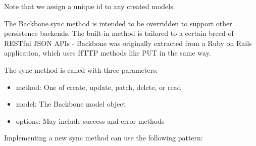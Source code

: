 \documentclass[9pt]{book}
\begin{document}
Note that we assign a unique id to any created models.

The Backbone.sync method is intended to be overridden to support other
persistence backends. The built-in method is tailored to a certain breed
of RESTful JSON APIs - Backbone was originally extracted from a Ruby on
Rails application, which uses HTTP methods like PUT in the same way.

The sync method is called with three parameters:

\begin{itemize}
\itemsep1pt\parskip0pt
\item
  method: One of create, update, patch, delete, or read
\item
  model: The Backbone model object
\item
  options: May include success and error methods
\end{itemize}

Implementing a new sync method can use the following pattern:
\end{document}
